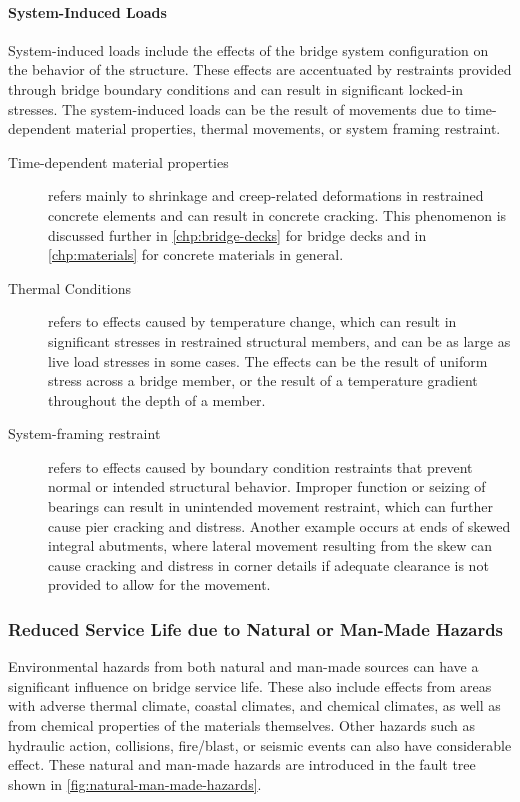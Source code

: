 \paragraph{System-Induced Loads}
System-induced loads include the effects of the bridge system configuration on the behavior of the structure. These effects are accentuated by restraints provided through bridge boundary conditions and can result in significant locked-in stresses. The system-induced loads can be the result of movements due to time-dependent material properties, thermal movements, or system framing restraint.

\begin{description}
  \item [Time-dependent material properties] refers mainly to shrinkage and creep-related deformations in restrained
  concrete elements and can result in concrete cracking. This phenomenon is discussed further in \cref{chp:bridge-decks} for bridge
  decks and in \cref{chp:materials} for concrete materials in general.
  \item [Thermal Conditions] refers to effects caused by temperature change, which can result in significant stresses in
  restrained structural members, and can be as large as live load stresses in some cases. The effects can be the result of
  uniform stress across a bridge member, or the result of a temperature gradient throughout the depth of a member.
  \item [System-framing restraint] refers to effects caused by boundary condition restraints that prevent normal or
  intended structural behavior. Improper function or seizing of bearings can result in unintended movement restraint,
  which can further cause pier cracking and distress. Another example occurs at ends of skewed integral abutments,
  where lateral movement resulting from the skew can cause cracking and distress in corner details if adequate
  clearance is not provided to allow for the movement.
\end{description}

\subsubsection{Reduced Service Life due to Natural or Man-Made Hazards}

Environmental hazards from both natural and man-made sources can have a significant influence on bridge service life. These also include effects from areas with adverse thermal climate, coastal climates, and chemical climates, as well as from chemical properties of the materials themselves. Other hazards such as hydraulic action, collisions, fire/blast, or seismic events can also have considerable effect. These natural and man-made hazards are introduced in the fault tree shown in \cref{fig:natural-man-made-hazards}.

